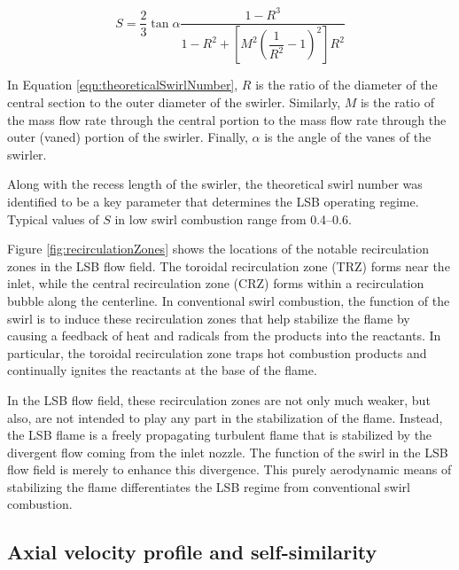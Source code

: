 \begin{equation}
S = \frac{2}{3} \tan \alpha \frac{ 1 - R^3 }{ 1 - R^2 + \left[ M^2\left( \dfrac{1}{R^2} - 1 \right)^2 \right]R^2}
\label{eqn:theoreticalSwirlNumber}
\end{equation}

  
In Equation \ref{eqn:theoreticalSwirlNumber}, \(R\) is the ratio of the diameter of the central section to the outer diameter of the swirler.
Similarly, \(M\) is the ratio of the mass flow rate through the central portion to the mass flow rate through the outer (vaned) portion of the swirler.
Finally, \(\alpha\) is the angle of the vanes of the swirler.

Along with the recess length of the swirler, the theoretical swirl number was identified to be a key parameter that determines the LSB operating regime.\cite{2002-littlejohn}
Typical values of \(S\) in low swirl combustion range from 0.4--0.6.

Figure \ref{fig:recirculationZones} shows the locations of the notable recirculation zones in the LSB flow field.
The toroidal recirculation zone (TRZ) forms near the inlet, while the central recirculation zone (CRZ) forms within a recirculation bubble along the centerline.
In conventional swirl combustion, the function of the swirl is to induce these recirculation zones that help stabilize the flame by causing a feedback of heat and radicals from the products into the reactants.
In particular, the toroidal recirculation zone traps hot combustion products and continually ignites the reactants at the base of the flame.\cite{2005-johnson}



In the LSB flow field, these recirculation zones are not only much weaker, but also, are not intended to play any part in the stabilization of the flame.
Instead, the LSB flame is a freely propagating turbulent flame that is stabilized by the divergent flow coming from the inlet nozzle.
The function of the swirl in the LSB flow field is merely to enhance this divergence.
This purely aerodynamic means of stabilizing the flame differentiates the LSB regime from conventional swirl combustion.

\subsection{Axial velocity profile and self-similarity}
\label{subsec:lsb-axial-velocity-profile}

